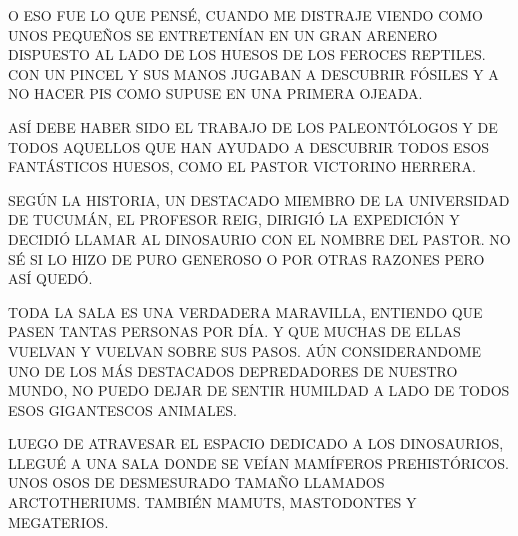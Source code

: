 O ESO FUE LO QUE PENSÉ, CUANDO ME DISTRAJE VIENDO COMO UNOS PEQUEÑOS SE ENTRETENÍAN EN UN GRAN ARENERO DISPUESTO AL LADO DE LOS HUESOS DE LOS FEROCES REPTILES. CON UN PINCEL Y SUS MANOS JUGABAN A DESCUBRIR FÓSILES Y A NO HACER PIS COMO SUPUSE EN UNA PRIMERA OJEADA. 

ASÍ DEBE HABER SIDO EL TRABAJO DE LOS PALEONTÓLOGOS Y DE TODOS AQUELLOS QUE HAN AYUDADO A DESCUBRIR TODOS ESOS FANTÁSTICOS HUESOS, COMO EL PASTOR VICTORINO HERRERA.

\newpage
{}
SEGÚN LA HISTORIA, UN DESTACADO MIEMBRO DE LA UNIVERSIDAD DE TUCUMÁN, EL PROFESOR REIG, DIRIGIÓ LA EXPEDICIÓN Y DECIDIÓ LLAMAR AL DINOSAURIO CON EL NOMBRE DEL PASTOR. NO SÉ SI LO HIZO DE PURO GENEROSO O POR OTRAS RAZONES PERO ASÍ QUEDÓ.

TODA LA SALA ES UNA VERDADERA MARAVILLA, ENTIENDO QUE PASEN TANTAS PERSONAS POR DÍA. Y QUE MUCHAS DE ELLAS VUELVAN Y VUELVAN SOBRE SUS PASOS. AÚN CONSIDERANDOME UNO DE LOS MÁS DESTACADOS DEPREDADORES DE NUESTRO MUNDO, NO PUEDO DEJAR DE SENTIR HUMILDAD A LADO DE TODOS ESOS GIGANTESCOS ANIMALES.

LUEGO DE ATRAVESAR EL ESPACIO DEDICADO A LOS DINOSAURIOS, LLEGUÉ A UNA SALA DONDE SE VEÍAN MAMÍFEROS PREHISTÓRICOS. UNOS OSOS DE DESMESURADO TAMAÑO LLAMADOS ARCTOTHERIUMS. TAMBIÉN MAMUTS, MASTODONTES Y MEGATERIOS.
